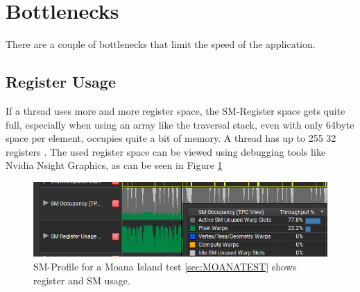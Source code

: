 \section{Bottlenecks}
\label{sec:Bottlenecks}
There are a couple of bottlenecks that limit the speed of the application.
\subsection{Register Usage}
\label{sec:BottleRegisterUsage}
If a thread uses more and more register space, the SM-Register space gets quite full, especially when using an array like the traversal stack, even with only 64byte space per element, occupies quite a bit of memory. A thread has up to 255 32 registers \cite{nvidiaAmpereGpu}. The used register space can be viewed using debugging tools like Nvidia Nsight Graphics, as can be seen in Figure \ref{fig:SMProfile}
\begin{figure}[h]
    \centering
    \includegraphics[width=.8\textwidth]{images/showcase/SMProfile.PNG}
    \caption{SM-Profile for a Moana Island test \ref{sec:MOANATEST} shows register and SM usage.}
    \label{fig:SMProfile}
\end{figure}
